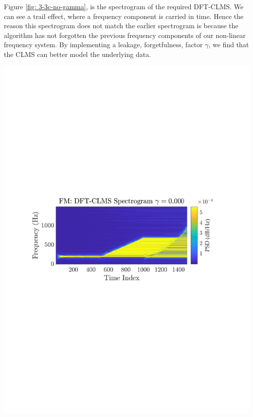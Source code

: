 \documentclass[12pt]{article}
\numberwithin{equation}{section}
\begin{document}
			\begin{minipage}[b]{0.49\textwidth}
				Figure \ref{fig: 3-3c-no-gamma}, is the spectrogram of the required DFT-CLMS. We can see a trail effect, where a frequency component is carried in time. Hence the reason this spectrogram does not match the earlier spectrogram is because the algorithm has not forgotten the previous frequency components of our non-linear frequency system. By implementing a leakage, forgetfulness, factor $\gamma$, we find that the CLMS can better model the underlying data.
			\end{minipage}%
			\begin{minipage}{0.04\textwidth}
				\hspace*{0.04\textwidth}
			\end{minipage}%
			\begin{minipage}[t]{0.49\textwidth}
				\centering
				\includegraphics[trim={2.2cm 11.2cm 3.15cm  11.2cm}, clip, width=\textwidth]{../MATLAB/figures/q3_3c_fig01.pdf} 
				
				\captionsetup{justification=centering}
				\label{fig: 3-3c-no-gamma}
			\end{minipage}%
		
\end{document}
